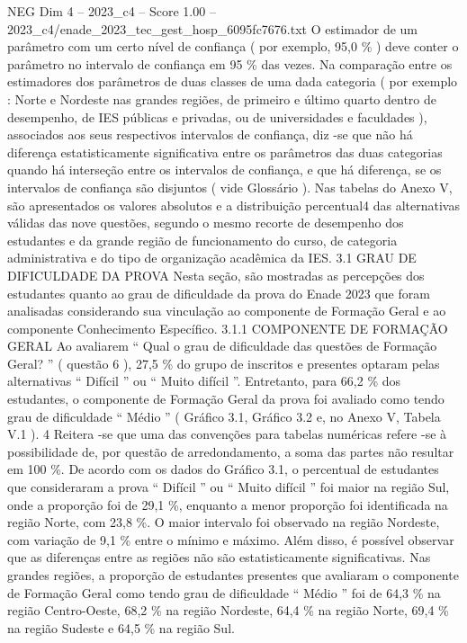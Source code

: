 \begin{textsample}{NEG Dim 4 – 2023\_c4 – Score 1.00 – 2023\_c4/enade\_2023\_tec\_gest\_hosp\_6095fc7676.txt}
O estimador de um parâmetro com um certo nível de confiança ( por exemplo, 95,0 \% ) deve conter o parâmetro no intervalo de confiança em 95 \% das vezes.
Na comparação entre os estimadores dos parâmetros de duas classes de uma dada categoria ( por exemplo : Norte e Nordeste nas grandes regiões, de primeiro e último quarto dentro de desempenho, de IES públicas e privadas, ou de universidades e faculdades ), associados aos seus respectivos intervalos de confiança, diz -se que não há diferença estatisticamente significativa entre os parâmetros das duas categorias quando há interseção entre os intervalos de confiança, e que há diferença, se os intervalos de confiança são disjuntos ( vide Glossário ).
Nas tabelas do Anexo V, são apresentados os valores absolutos e a distribuição percentual4 das alternativas válidas das nove questões, segundo o mesmo recorte de desempenho dos estudantes e da grande região de funcionamento do curso, de categoria administrativa e do tipo de organização acadêmica da IES. 3.1 GRAU DE DIFICULDADE DA PROVA Nesta seção, são mostradas as percepções dos estudantes quanto ao grau de dificuldade da prova do Enade 2023 que foram analisadas considerando sua vinculação ao componente de Formação Geral e ao componente Conhecimento Específico. 3.1.1 COMPONENTE DE FORMAÇÃO GERAL Ao avaliarem “ Qual o grau de dificuldade das questões de Formação Geral? ” ( questão 6 ), 27,5 \% do grupo de inscritos e presentes optaram pelas alternativas “ Difícil ” ou “ Muito difícil ”.
Entretanto, para 66,2 \% dos estudantes, o componente de Formação Geral da prova foi avaliado como tendo grau de dificuldade “ Médio ” ( Gráfico 3.1, Gráfico 3.2 e, no Anexo V, Tabela V.1 ). 4 Reitera -se que uma das convenções para tabelas numéricas refere -se à possibilidade de, por questão de arredondamento, a soma das partes não resultar em 100 \%.
De acordo com os dados do Gráfico 3.1, o percentual de estudantes que consideraram a prova “ Difícil ” ou “ Muito difícil ” foi maior na região Sul, onde a proporção foi de 29,1 \%, enquanto a menor proporção foi identificada na região Norte, com 23,8 \%.
O maior intervalo foi observado na região Nordeste, com variação de 9,1 \% entre o mínimo e máximo.
Além disso, é possível observar que as diferenças entre as regiões não são estatisticamente significativas.
Nas grandes regiões, a proporção de estudantes presentes que avaliaram o componente de Formação Geral como tendo grau de dificuldade “ Médio ” foi de 64,3 \% na região Centro-Oeste, 68,2 \% na região Nordeste, 64,4 \% na região Norte, 69,4 \% na região Sudeste e 64,5 \% na região Sul.

\end{textsample}
